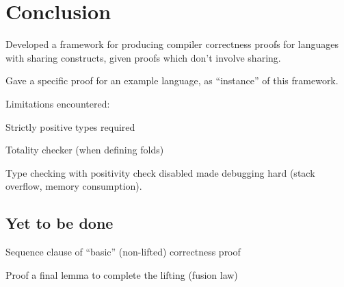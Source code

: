 \section{Conclusion}

    \item Developed a framework for producing compiler correctness proofs
      for languages with sharing constructs, given proofs which don't involve sharing.
           \item Gave a specific proof for an example language, as ``instance'' of this framework.

    \item Limitations encountered:
       \item Strictly positive types required
       \item Totality checker (when defining folds)
       \item Type checking with positivity check disabled made debugging hard (stack overflow, memory consumption).
         

    \subsection{Yet to be done}
        \item Sequence clause of ``basic'' (non-lifted) correctness proof
        \item Proof a final lemma to complete the lifting (fusion law)
